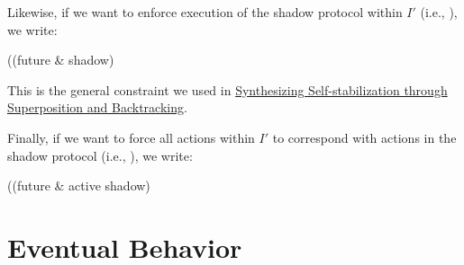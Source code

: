 Likewise, if we want to enforce execution of the shadow protocol within $I'$ (i.e., ), we write:
\begin{code}
((future & shadow) %
\end{code}
This is the general constraint we used in \href{http://dx.doi.org/10.1007/978-3-319-11764-5_18}{Synthesizing Self-stabilization through Superposition and Backtracking}.

Finally, if we want to force all actions within $I'$ to correspond with actions in the shadow protocol (i.e., ), we write:
\begin{code}
((future & active shadow) %
\end{code}


\section{Eventual Behavior}


